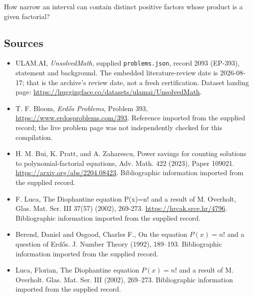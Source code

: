 \documentclass[11pt,a4paper]{article}
\begin{document}
How narrow an interval can contain distinct positive factors whose product is a given factorial?

\subsection{Sources}

{\small

\begin{itemize}

\item[\hypertarget{source:2093:1}{S1}] ULAM.AI, \emph{UnsolvedMath}, supplied \texttt{problems.json}, record 2093 (EP-393), statement and background. The embedded literature-review date is 2026-08-17; that is the archive’s review date, not a fresh certification. Dataset landing page: \url{https://huggingface.co/datasets/ulamai/UnsolvedMath}.

\item[\hypertarget{source:2093:2}{S2}] T. F. Bloom, \emph{Erdős Problems}, Problem 393, \url{https://www.erdosproblems.com/393}. Reference imported from the supplied record; the live problem page was not independently checked for this compilation.

\item[\hypertarget{source:2093:3}{S3}] H. M. Bui, K. Pratt, and A. Zaharescu, Power savings for counting solutions to polynomial-factorial equations, Adv. Math. 422 (2023), Paper 109021. \url{https://arxiv.org/abs/2204.08423}. Bibliographic information imported from the supplied record.

\item[\hypertarget{source:2093:4}{S4}] F. Luca, The Diophantine equation P(x)=n! and a result of M. Overholt, Glas. Mat. Ser. III 37(57) (2002), 269-273. \url{https://hrcak.srce.hr/4796}. Bibliographic information imported from the supplied record.

\item[\hypertarget{source:2093:5}{S5}] Berend, Daniel and Osgood, Charles F., On the equation {$P(x)=n!$} and a question of {E}rd\H{o}s. J. Number Theory (1992), 189--193. Bibliographic information imported from the supplied record.

\item[\hypertarget{source:2093:6}{S6}] Luca, Florian, The {D}iophantine equation {$P(x)=n!$} and a result of {M}. {O}verholt. Glas. Mat. Ser. III (2002), 269--273. Bibliographic information imported from the supplied record.

\end{itemize}

}

\label{end:2093}
\end{document}
